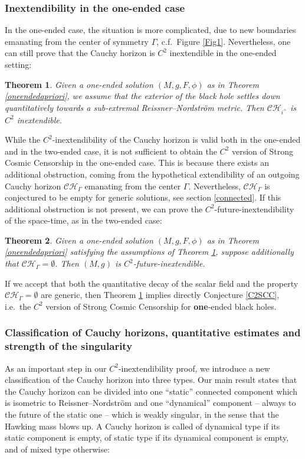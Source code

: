\documentclass[10pt,a4paper]{article}
\theoremstyle{plain}
\newtheorem{theo}{Theorem}
\theoremstyle{remark}
\theoremstyle{definition}
\theoremstyle{plain}
\theoremstyle{remark}
\theoremstyle{definition}
\newcommand{\CH}{\mathcal{CH}_{i^+}}
\numberwithin{equation}{section}
\begin{document}
 \subsubsection{Inextendibility in the one-ended case}
 In the one-ended case, the situation is more complicated, due to new boundaries emanating from the center of symmetry $\Gamma$, c.f.\ Figure \ref{Fig1}. Nevertheless, one can still prove that the Cauchy horizon is $C^2$ inextendible in the one-ended setting:
 \begin{theo} \label{rough1}
 	Given a one-ended solution $(M,g,F,\phi)$ as in Theorem \ref{oneendedapriori}, we assume that the exterior of the black hole settles down quantitatively towards a sub-extremal Reissner--Nordstr\"{o}m metric. Then $\CH$ is $C^2$ inextendible.
 \end{theo}
 While the $C^2$-inextendibility of the Cauchy horizon is valid both in the one-ended and in the two-ended case, it is not sufficient to obtain the $C^2$ version of Strong Cosmic Censorship in the one-ended case. This is because there exists an additional obstruction, coming from the hypothetical extendibility of an outgoing Cauchy horizon $\mathcal{CH}_{\Gamma}$ emanating from the center $\Gamma$. Nevertheless, $\mathcal{CH}_{\Gamma}$ is conjectured to be empty for generic solutions, see section \ref{connected}. If this additional obstruction is not present, we can prove the $C^2$-future-inextendibility of the space-time, as in the two-ended case:\begin{theo} \label{rough1cond}
 	Given a one-ended solution $(M,g,F,\phi)$ as in Theorem \ref{oneendedapriori} satisfying the assumptions of Theorem \ref{rough1}, suppose additionally that $\mathcal{CH}_{\Gamma}=\emptyset$. Then $(M,g)$ is $C^2$-future-inextendible.
 \end{theo}
 If we accept that both the quantitative decay of the scalar field and the property $\mathcal{CH}_{\Gamma}=\emptyset$ are generic, then Theorem \ref{rough1} implies directly Conjecture \ref{C2SCC}, i.e.\ the $C^2$ version of Strong Cosmic Censorship for \textbf{one}-ended black holes.
 \subsubsection{Classification of Cauchy horizons, quantitative estimates and strength of the singularity}
 As an important step in our $C^2$-inextendibility proof, we introduce a new classification of the Cauchy horizon into three types. Our main result states that the Cauchy horizon can be divided into one ``static'' connected component which is isometric to Reissner--Nordstr\"{o}m and one ``dynamical'' component -- always to the future of the static one -- which is weakly singular, in the sense that the Hawking mass blows up. A Cauchy horizon is called of dynamical type if its static component is empty, of static type if its dynamical component is empty, and of mixed type otherwise:
 
\end{document}
